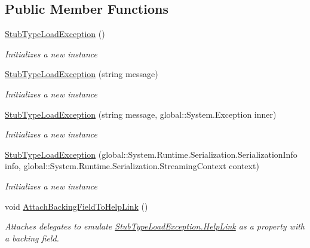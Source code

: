 \subsection*{Public Member Functions}
\begin{DoxyCompactItemize}
\item 
\hyperlink{class_system_1_1_fakes_1_1_stub_type_load_exception_a83a157fb77be4639f421c83daded75ad}{Stub\-Type\-Load\-Exception} ()
\begin{DoxyCompactList}\small\item\em Initializes a new instance\end{DoxyCompactList}\item 
\hyperlink{class_system_1_1_fakes_1_1_stub_type_load_exception_a6dddc83de90f454e7b545f2e4fbd5f03}{Stub\-Type\-Load\-Exception} (string message)
\begin{DoxyCompactList}\small\item\em Initializes a new instance\end{DoxyCompactList}\item 
\hyperlink{class_system_1_1_fakes_1_1_stub_type_load_exception_a089afe83ab5b972f24e03b9afcd080b5}{Stub\-Type\-Load\-Exception} (string message, global\-::\-System.\-Exception inner)
\begin{DoxyCompactList}\small\item\em Initializes a new instance\end{DoxyCompactList}\item 
\hyperlink{class_system_1_1_fakes_1_1_stub_type_load_exception_a28aa1cc01b6302f09e2fc3f94d1e0b77}{Stub\-Type\-Load\-Exception} (global\-::\-System.\-Runtime.\-Serialization.\-Serialization\-Info info, global\-::\-System.\-Runtime.\-Serialization.\-Streaming\-Context context)
\begin{DoxyCompactList}\small\item\em Initializes a new instance\end{DoxyCompactList}\item 
void \hyperlink{class_system_1_1_fakes_1_1_stub_type_load_exception_a2fd8886975963303dc310582b345a5e3}{Attach\-Backing\-Field\-To\-Help\-Link} ()
\begin{DoxyCompactList}\small\item\em Attaches delegates to emulate \hyperlink{class_system_1_1_fakes_1_1_stub_type_load_exception_a65a9b3f323bee4a371f7a9e96af2694e}{Stub\-Type\-Load\-Exception.\-Help\-Link} as a property with a backing field.\end{DoxyCompactList}\item 

\end{DoxyCompactItemize}
